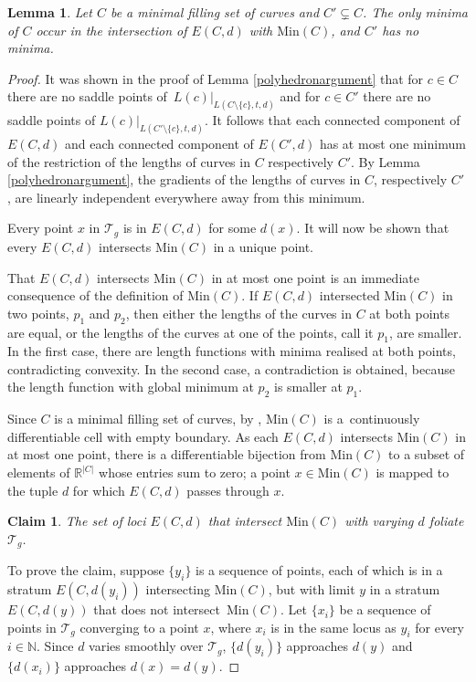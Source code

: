 \documentclass[pdftex]{sigma}
\numberwithin{equation}{section}
\newtheorem{Lemma}[Theorem]{Lemma}
\newtheorem*{Claim}{Claim}
{ \theoremstyle{definition}
 \newtheorem{Definition}[Theorem]{Definition}
 \newtheorem{Note}[Theorem]{Note}
 \newtheorem{Example}[Theorem]{Example}
 \newtheorem{Remark}[Theorem]{Remark}
 \newtheorem{observation}[Theorem]{Observation}
}
\begin{document}
\begin{Lemma}
\label{minimalem}
Let $C$ be a minimal filling set of curves and $C'\subsetneq C$. The only minima of $C$ occur in the intersection of $E(C,d)$ with $\mathrm{Min}(C)$, and $C'$ has no minima.
\end{Lemma}
\begin{proof}
It was shown in the proof of Lemma \ref{polyhedronargument} that for $c\in C$ there are no saddle points of~$L(c)|_{L(C\setminus\{c\},t,d)}$ and for $c\in C'$ there are no saddle points of $L(c)|_{L(C'\setminus\{c\},t,d)}$. It follows that each connected component of $E(C,d)$ and each connected component of $E(C',d)$ has at most one minimum of the restriction of the lengths of curves in $C$ respectively $C'$. By Lemma \ref{polyhedronargument}, the gradients of the lengths of curves in $C$, respectively $C'$, are linearly independent everywhere away from this minimum.

Every point $x$ in $\mathcal{T}_{g}$ is in $E(C,d)$ for some $d(x)$. It will now be shown that every $E(C,d)$ intersects $\mathrm{Min}(C)$ in a unique point.

That $E(C,d)$ intersects $\mathrm{Min}(C)$ in at most one point is an immediate consequence of the definition of $\mathrm{Min}(C)$. If $E(C,d)$ intersected $\mathrm{Min}(C)$ in two points, $p_{1}$ and $p_{2}$, then either the lengths of the curves in $C$ at both points are equal, or the lengths of the curves at one of the points, call it $p_{1}$, are smaller. In the first case, there are length functions with minima realised at both points, contradicting convexity. In the second case, a contradiction is obtained, because the length function with global minimum at $p_{2}$ is smaller at $p_{1}$.

Since $C$ is a minimal filling set of curves, by \cite[Lemma 9, Theorem 10]{SchmutzMorse}, $\mathrm{Min}(C)$ is a~continuously differentiable cell with empty boundary. As each $E(C,d)$ intersects $\mathrm{Min}(C)$ in at most one point, there is a differentiable bijection from $\mathrm{Min}(C)$ to a subset of elements of $\mathbb{R}^{|C|}$ whose entries sum to zero; a point $x\in \mathrm{Min}(C)$ is mapped to the tuple $d$ for which $E(C,d)$ passes through $x$.

\begin{Claim}
The set of loci $E(C,d)$ that intersect $\mathrm{Min}(C)$ with varying $d$ foliate $\mathcal{T}_{g}$.
\end{Claim}

To prove the claim, suppose $\{y_{i}\}$ is a sequence of points, each of which is in a stratum $E(C,d(y_{i}))$ intersecting $\mathrm{Min}(C)$, but with limit $y$ in a stratum $E(C,d(y))$ that does not intersect~$\mathrm{Min}(C)$. Let $\{x_{i}\}$ be a sequence of points in $\mathcal{T}_{g}$ converging to a point $x$, where $x_{i}$ is in the same locus as $y_{i}$ for every $i\in \mathbb{N}$. Since $d$ varies smoothly over $\mathcal{T}_{g}$, $\{d(y_{i})\}$ approaches $d(y)$ and~$\{d(x_{i})\}$ approaches $d(x)=d(y)$.


\end{proof}
\end{document}
